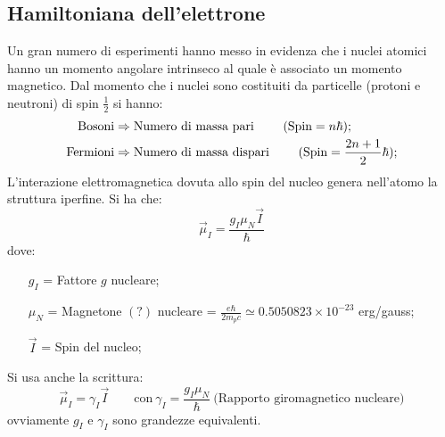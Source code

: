 \subsection{Hamiltoniana dell'elettrone}
Un gran numero di esperimenti hanno messo in evidenza che i nuclei atomici hanno
un momento angolare intrinseco al quale è associato un momento magnetico. Dal
momento che i nuclei sono costituiti da particelle (protoni e neutroni) di spin
$\frac{1}{2}$ si hanno:
\begin{equation} \begin{split}
\text{Bosoni}& \Rightarrow \text{Numero di massa pari \qquad(Spin} = n\hbar);\\
\text{Fermioni}& \Rightarrow \text{Numero di massa dispari \qquad(Spin} = \frac{2n+1}{2}\hbar);
\end{split}\end{equation}
L'interazione elettromagnetica dovuta allo spin del nucleo genera nell'atomo la struttura iperfine. Si ha che:
\begin{equation}
\vec{\mu}_I = \frac{g_I \mu_N \vec{I}} {\hbar}
\end{equation}
dove:
\begin{itemize}
\item[$g_I$]= Fattore $g$ nucleare;
\item[$\mu _N$]= Magnetone $(?)$ nucleare = $\frac{e\hbar}{2m_pc} \simeq 0.5050823 \times 10^{-23}$ erg/gauss;
\item[$\vec{I}$]= Spin del nucleo;
\end{itemize}
Si usa anche la scrittura:
\begin{equation}
\vec{\mu}_I =  \gamma_I \vec{I} \qquad \text{con}\ \gamma_I = \frac{g_I \mu_N}{\hbar}\ \text{(Rapporto giromagnetico nucleare)}
\end{equation}
ovviamente $g_I$ e $\gamma_I$ sono grandezze equivalenti.

